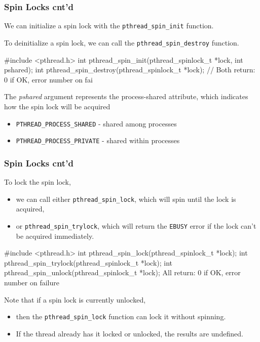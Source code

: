 \documentclass[newPxFont,sthlmFooter,nooffset]{beamer}
\begin{document}
\begin{frame}[t, fragile]
  \frametitle{Spin Locks cnt'd}
We can initialize a spin lock with the \texttt{pthread\_spin\_init} function.

To deinitialize a spin lock, we can call the \texttt{pthread\_spin\_destroy} function.

\begin{codedef}
#include <pthread.h>
int pthread_spin_init(pthread_spinlock_t *lock, int pshared);
int pthread_spin_destroy(pthread_spinlock_t *lock);
// Both return: 0 if OK, error number on fai
\end{codedef}

The \textit{pshared} argument represents the process-shared attribute, which indicates how the spin lock will be acquired
\begin{itemize}
\item \texttt{PTHREAD\_PROCESS\_SHARED} - shared among processes
\item  \texttt{PTHREAD\_PROCESS\_PRIVATE} - shared within processes
\end{itemize}
\end{frame}

\begin{frame}[t, fragile]
  \frametitle{Spin Locks cnt'd}

To lock the spin lock,
\begin{itemize}
\item we can call either \texttt{pthread\_spin\_lock}, which will spin
  until the lock is acquired,
\item or \texttt{pthread\_spin\_trylock}, which will return the
  \texttt{EBUSY} error if the lock can’t be acquired immediately.
\end{itemize}

  \begin{codedef}
#include <pthread.h>
int pthread_spin_lock(pthread_spinlock_t *lock);
int pthread_spin_trylock(pthread_spinlock_t *lock);
int pthread_spin_unlock(pthread_spinlock_t *lock);
All return: 0 if OK, error number on failure
  \end{codedef}

Note that if a spin lock is currently unlocked,
\begin{itemize}
\item then the \texttt{pthread\_spin\_lock} function can lock it without
  spinning.
\item If the thread already has it locked or unlocked, the results are undefined.
\end{itemize}

\end{frame}
\end{document}
